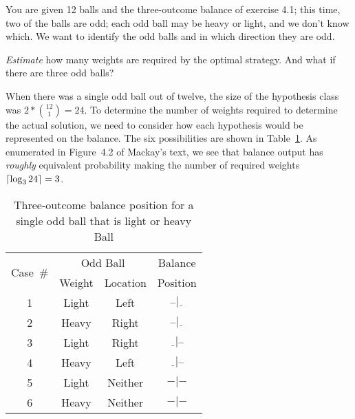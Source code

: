 \begin{problem}{4}{14}
  You are given 12 balls and the three-outcome balance of exercise 4.1; this time, two of the balls are odd; each odd ball may be heavy or light, and we don't know which.  We want to identify the odd balls and in which direction they are odd.
\end{problem}



\begin{subproblem}
  \textit{Estimate} how many weights are required by the optimal strategy.  And what if there are three odd balls?
\end{subproblem}

  When there was a single odd ball out of twelve, the size of the hypothesis class was ${2 * \binom{12}{1} = 24}$.  To determine the number of weights required to determine the actual solution, we need to consider how each hypothesis would be represented on the balance.  The six possibilities are shown in Table~\ref{tab:p1OneBallTable}.  As enumerated in Figure~4.2 of Mackay's text, we see that balance output has \textit{roughly} equivalent probability making the number of required weights ${\lceil \log_{3} 24 \rceil=3}$.
  
  \begin{table}[H]
    \centering
    \caption{Three-outcome balance position for a \\single odd ball that is light or heavy Ball}\label{tab:p1OneBallTable}
    \begin{tabular}{|c||c|c||c|}
      \hline
      \multirow{2}{*}{Case~\#} &  \multicolumn{2}{c||}{Odd Ball} & Balance\\\cline{2-3}
          &  Weight  &  Location &  Position  \\ \hline\hline
      1   &  Light   &  Left     &  $\bar{~}\bar{~}|\underline{~~}$ \\ \hline
      2   &  Heavy   &  Right    &  $\bar{~}\bar{~}|\underline{~~}$ \\ \hline\hline
      3   &  Light   &  Right    &  $\underline{~~}|\bar{~}\bar{~}$ \\ \hline
      4   &  Heavy   &  Left     &  $\underline{~~}|\bar{~}\bar{~}$ \\ \hline\hline
      5   &  Light   &  Neither  &  $-|-$ \\ \hline
      6   &  Heavy   &  Neither  &  $-|-$ \\ \hline
    \end{tabular}
  \end{table}

